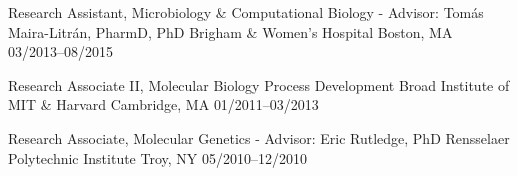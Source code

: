 \begin{cventries}
\cventry
{Research Assistant, Microbiology \& Computational Biology - Advisor: Tom\'{a}s Maira-Litr\'{a}n, PharmD, PhD}
{Brigham \& Women's Hospital}
{Boston, MA}
{03/2013--08/2015}
{
}

\vspace{-0.4cm}
       
\cventry
{Research Associate II, Molecular Biology Process Development}
{Broad Institute of MIT \& Harvard}
{Cambridge, MA}
{01/2011--03/2013}
{
}

\vspace{-0.4cm}

\cventry
{Research Associate, Molecular Genetics - Advisor: Eric Rutledge, PhD}
{Rensselaer Polytechnic Institute}
{Troy, NY}
{05/2010--12/2010}
{
}


\end{cventries}
